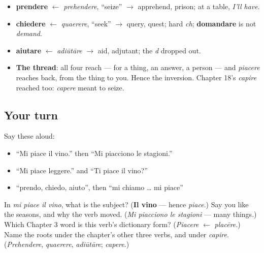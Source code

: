 \begin{grammarlens}[title={What you've built this chapter}]
\begin{itemize}
\raggedright
  \item \textbf{prendere} $\leftarrow$ \emph{prehendere}, \textquotedblleft{}seize\textquotedblright{} $\to$ apprehend, prison; at a table, \emph{I'll have}.
  \item \textbf{chiedere} $\leftarrow$ \emph{quaerere}, \textquotedblleft{}seek\textquotedblright{} $\to$ query, quest; hard \emph{ch}; \textbf{domandare} is not \emph{demand}.
  \item \textbf{aiutare} $\leftarrow$ \emph{adiūtāre} $\to$ aid, adjutant; the \emph{d} dropped out.
  \item \textbf{The thread}: all four reach — for a thing, an answer, a person — and \emph{piacere} reaches back, from the thing to you. Hence the inversion. Chapter 18's \emph{capire} reached too: \emph{capere} meant to seize.
\end{itemize}
\end{grammarlens}

\subsection*{Your turn}
Say these aloud:

\begin{itemize}
\raggedright
  \item \textquotedblleft{}Mi piace il vino.\textquotedblright{} then \textquotedblleft{}Mi piacciono le stagioni.\textquotedblright{}
  \item \textquotedblleft{}Mi piace leggere.\textquotedblright{} and \textquotedblleft{}Ti piace il vino?\textquotedblright{}
  \item \textquotedblleft{}prendo, chiedo, aiuto\textquotedblright{}, then \textquotedblleft{}mi chiamo … mi piace\textquotedblright{}
\end{itemize}

\begin{tcolorbox}[breakable,colback=teal!4,colframe=teal!35!black,title={Before you move on}]
In \emph{mi piace il vino}, what is the subject? (\textbf{Il vino} — hence \emph{piace}.) Say you like the seasons, and why the verb moved. (\emph{Mi piacciono le stagioni} — many things.) Which Chapter 3 word is this verb's dictionary form? (\emph{Piacere} $\leftarrow$ \emph{placēre}.) Name the roots under the chapter's other three verbs, and under \emph{capire}. (\emph{Prehendere}, \emph{quaerere}, \emph{adiūtāre}; \emph{capere}.)
\end{tcolorbox}
